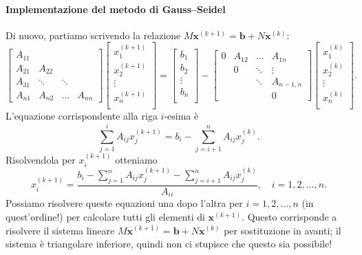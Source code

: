 \documentclass[a4paper]{report}
\theoremstyle{definiton}
\theoremstyle{remark}
\newcommand{\x}{\mathbf{x}}
\renewcommand{\b}{\mathbf{b}}
\begin{document}
\paragraph{Implementazione del metodo di Gauss--Seidel}

Di nuovo, partiamo scrivendo la relazione $M\x^{(k+1)} = \b + N\x^{(k)}$:
\[
\begin{bmatrix}
    A_{11}\\
    A_{21} & A_{22}\\
    A_{31}& \ddots & \ddots \\
    A_{n1}& A_{n2} &\dots & A_{nn}
\end{bmatrix}
\begin{bmatrix}
    x_1^{(k+1)}\\
    x_2^{(k+1)}\\
    \vdots\\
    x_n^{(k+1)}\\
\end{bmatrix}
=
\begin{bmatrix}
    b_1\\
    b_2\\
    \vdots\\
    b_n\\
\end{bmatrix}
-
\begin{bmatrix}
     0& A_{12} & \dots & A_{1n}\\
     & 0 & \ddots & \vdots\\
     &  & \ddots & A_{n-1,n}\\
     & &  & 0
\end{bmatrix}
\begin{bmatrix}
    x_1^{(k)}\\
    x_2^{(k)}\\
    \vdots \\
    x_n^{(k)}\\
\end{bmatrix}.
\]
L'equazione corrispondente alla riga $i$-esima è
\[
\sum_{j=1}^i A_{ij}x_j^{(k+1)} = b_i - \sum_{j=i+1}^n A_{ij}x_j^{(k)}. 
\]
Risolvendola per $x_{i}^{(k+1)}$ otteniamo
\begin{equation} \label{GS}
    x_{i}^{(k+1)} = \frac{b_i - \sum_{j=1}^n A_{ij}x_j^{(k+1)} - \sum_{j=i+1}^n A_{ij}x_j^{(k)} }{A_{ii}}, \quad i=1,2,\dots,n.
\end{equation}
Possiamo risolvere queste equazioni una dopo l'altra per $i=1,2,\dots,n$ (in quest'ordine!) per calcolare tutti gli elementi di $\x^{(k+1)}$. Questo corrisponde a risolvere il sistema lineare $M\x^{(k+1)} = \b + N\x^{(k)}$ per sostituzione in avanti; il sistema è triangolare inferiore, quindi non ci stupisce che questo sia possibile!
\end{document}
